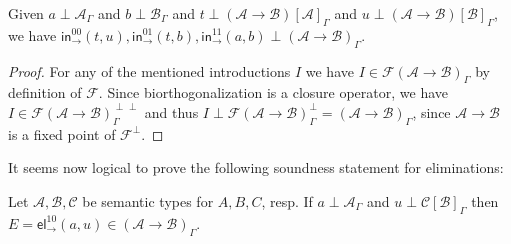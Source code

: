 \documentclass[a4paper,USenglish,cleveref, autoref, thm-restate]{lipics-v2019}
\newenvironment{caselist}{%
  \begin{list}{{\it Case}}{%
  }%
}{\end{list}%
}
\newcommand{\nextcase}{\item~}
\newcommand{\tin}{\ensuremath{\mathsf{in}}}
\newcommand{\inn}[2]{\ensuremath{\tin_{#1}^{#2}}}
\newcommand{\tel}{\mathsf{el}}
\newcommand{\el}[2]{\ensuremath{\tel_{#1}^{#2}}}
\newcommand{\contract}[1][]{\mapsto_{#1}}
\newcommand{\A}{\mathcal{A}}
\newcommand{\B}{\mathcal{B}}
\newcommand{\C}{\mathcal{C}}
\newcommand{\F}{\mathcal{F}}
\newcommand{\SN}{\mathsf{SN}}
\begin{document}
\begin{lemma}
  \label{lem:funintro}
  Given
  $a \perp \A_\Gamma$ and
  $b \perp \B_\Gamma$ and
  $t \perp (\A \to \B)[\A]_\Gamma$ and
  $u \perp (\A \to \B)[\B]_\Gamma$,
  we have
    $\inn\to{00}(t,u),
     \inn\to{01}(t,b),
     \inn\to{11}(a,b) \perp (\A \to \B)_\Gamma$.
\end{lemma}
\begin{proof}
  For any of the mentioned introductions $I$ we have
  $I \in \F(\A \to \B)_\Gamma$ by definition of $\F$.
  Since biorthogonalization is a closure operator, we have
  $I \in \F(\A \to \B)^{\perp\perp}_\Gamma$ and thus
  $I \perp \F(\A \to \B)^{\perp}_\Gamma = (\A \to \B)_\Gamma$,
  since $\A \to \B$ is a fixed point of $\F^\perp$.
\end{proof}
%
It seems now logical to prove the following soundness statement for
eliminations:
\begin{lemma}
  \label{lem:appprelim}
  Let $\A,\B,\C$ be semantic types for $A,B,C$, resp.  If
  $a \perp \A_\Gamma$ and $u \perp \C[\B]_\Gamma$ then
  $E = \el\to{10}(a,u) \in (\A \to \B)_\Gamma$.
\end{lemma}
%
%
\end{document}
